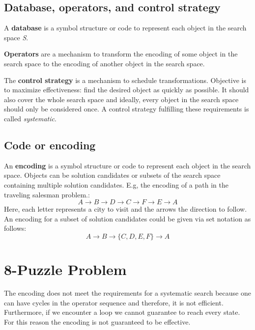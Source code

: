 \documentclass[11pt]{article}
\begin{document}
\subsection{Database, operators, and control strategy}
A \textbf{database} is a symbol structure or code to represent each object in the search space \emph{S}.

\textbf{Operators} are a mechanism to transform the encoding of some object in the search space to the encoding of another object in the search space.

The \textbf{control strategy} is a mechanism to schedule transformations. Objective is to maximize effectiveness: find the desired object as quickly as possible. It should also cover the whole search space and ideally, every object in the search space should only be considered once. A control strategy fulfilling these requirements is called \emph{systematic}. 

\subsection{Code or encoding}
An \textbf{encoding} is a symbol structure or code to represent each object in the search space. Objects can be solution candidates or subsets of the search space containing multiple solution candidates. E.g, the encoding of a path in the traveling salesman problem.:
\begin{equation*}
A \rightarrow B \rightarrow D \rightarrow C \rightarrow F \rightarrow E \rightarrow A
\end{equation*}
Here, each letter represents a city to visit and the arrows the direction to follow. An encoding for a subset of solution candidates could be given via set notation as follows:
\begin{equation*}
A \rightarrow B \rightarrow \{C,D,E,F\} \rightarrow A
\end{equation*}

\section{8-Puzzle Problem}
The encoding does not meet the requirements for a systematic search because one can have cycles in the operator sequence and therefore, it is not efficient. Furthermore, if we encounter a loop we cannot guarantee to reach every state. For this reason the encoding is not guaranteed to be effective.
\end{document}
